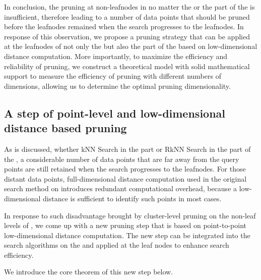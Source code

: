 In conclusion, the pruning at non-leafnodes in no matter the \hdrtree or the \deltatree part of the \dualtree is insufficient, therefore leading to a number of data points that should be pruned before the leafnodes remained when the search progresses to the leafnodes. In response of this observation, we propose a pruning strategy that can be applied at the leafnodes of not only the \hdrtree but also the \deltatree part of the \dualtree based on low-dimensional distance computation. More importantly, to maximize the efficiency and reliability of pruning, we construct a theoretical model with solid mathematical support to measure the efficiency of pruning with different numbers of dimensions, allowing us to determine the optimal pruning dimensionality.   

\subsection{A step of point-level and low-dimensional distance based pruning}

As is discussed, whether kNN Search in the \deltatree part or RkNN Search in the \hdrtree part of the \dualtree, a considerable number of data points that are far away from the query points are still retained when the search progresses to the leafnodes. For those distant data points, full-dimensional distance computation used in the original search method on \dualtree introduces redundant computational overhead, because a low-dimensional distance is sufficient to identify such points in most cases. 

In response to such disadvantage brought by cluster-level pruning on the non-leaf levels of \dualtree, we come up with a new pruning step that is based on point-to-point low-dimensional distance computation. The new step can be integrated into the search algorithms on the \dualtree and applied at the leaf nodes to enhance search efficiency.  

We introduce the core theorem of this new step below.


